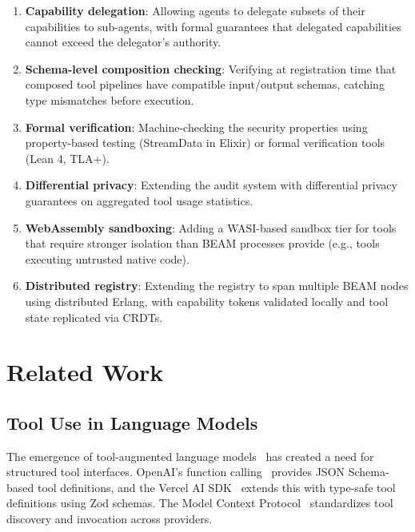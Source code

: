 \documentclass[12pt,a4paper]{article}
\theoremstyle{plain}
\theoremstyle{definition}
\begin{document}
\begin{enumerate}[leftmargin=2em]
\item \textbf{Capability delegation}: Allowing agents to delegate subsets of their capabilities to sub-agents, with formal guarantees that delegated capabilities cannot exceed the delegator's authority.

\item \textbf{Schema-level composition checking}: Verifying at registration time that composed tool pipelines have compatible input/output schemas, catching type mismatches before execution.

\item \textbf{Formal verification}: Machine-checking the security properties using property-based testing (StreamData in Elixir) or formal verification tools (Lean 4, TLA+).

\item \textbf{Differential privacy}: Extending the audit system with differential privacy guarantees on aggregated tool usage statistics.

\item \textbf{WebAssembly sandboxing}: Adding a WASI-based sandbox tier for tools that require stronger isolation than BEAM processes provide (e.g., tools executing untrusted native code).

\item \textbf{Distributed registry}: Extending the registry to span multiple BEAM nodes using distributed Erlang, with capability tokens validated locally and tool state replicated via CRDTs.
\end{enumerate}


\section{Related Work}
\label{sec:related}

\subsection{Tool Use in Language Models}

The emergence of tool-augmented language models~\citep{schiller2024toolformer} has created a need for structured tool interfaces. OpenAI's function calling~\citep{openai2024function} provides JSON Schema-based tool definitions, and the Vercel AI SDK~\citep{vercel2024aisdk} extends this with type-safe tool definitions using Zod schemas. The Model Context Protocol~\citep{mcp2024spec} standardizes tool discovery and invocation across providers.
\end{document}
